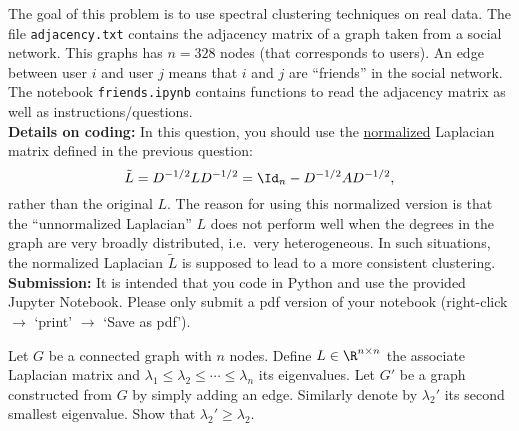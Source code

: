 \documentclass[11pt,nocut]{article}
\begin{document}
\begin{problem}[3 points]
	The goal of this problem is to use spectral clustering techniques on real data.
	The file \texttt{adjacency.txt} contains the adjacency matrix of a graph taken from a social network. This graphs has $n=328$ nodes (that corresponds to users). An edge between user $i$ and user $j$ means that $i$ and $j$ are ``friends'' in the social network.
	The notebook \texttt{friends.ipynb} contains functions to read the adjacency matrix as well as instructions/questions.
	\\

\noindent
\textbf{Details on coding:} In this question, you should use the \underline{normalized} Laplacian matrix defined in the previous question: 
$$
\tilde{L} = D^{-1/2} L D^{-1/2} = \Id_n - D^{-1/2} A D^{-1/2},
$$
rather than the original $L$. The reason for using this normalized version is that the ``unnormalized Laplacian'' $L$ does not perform well when the degrees in the graph are very broadly distributed, i.e.\ very heterogeneous. In such situations, the normalized Laplacian $\tilde{L}$ is supposed to lead to a more consistent clustering. 
\\

\noindent
\textbf{Submission:} It is intended that you code in Python and use the provided Jupyter Notebook. Please only submit a pdf version of your notebook (right-click $\to$ `print' $\to$ `Save as pdf').
\end{problem}

\vspace{2mm}

\begin{problem}[$\star$]
Let $G$ be a connected graph with $n$ nodes. Define $L \in \R^{n \times n}$ the associate Laplacian matrix and $\lambda_1 \leq \lambda_2 \leq \cdots \leq \lambda_n$ its eigenvalues. Let $G'$ be a graph constructed from $G$ by simply adding an edge. Similarly denote by $\lambda_2'$ its second smallest eigenvalue. Show that  $\lambda_2' \geq \lambda_2$. 
\end{problem}





    
\end{document}
